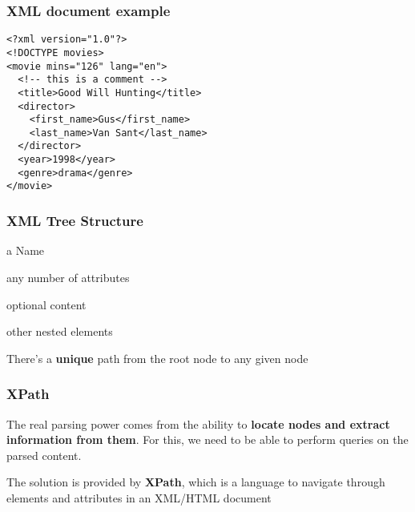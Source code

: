 \documentclass[12pt]{beamer}\usepackage[]{graphicx}\usepackage[]{color}
\begin{document}

\begin{frame}[fragile]
\frametitle{XML document example}

\begin{verbatim}
<?xml version="1.0"?>
<!DOCTYPE movies>
<movie mins="126" lang="en">
  <!-- this is a comment -->
  <title>Good Will Hunting</title>
  <director>
    <first_name>Gus</first_name>
    <last_name>Van Sant</last_name>
  </director>
  <year>1998</year>
  <genre>drama</genre>
</movie>
\end{verbatim}
\eb

\end{frame}


\begin{frame}
\frametitle{XML Tree Structure}

\bi
 \item a Name
 \item any number of attributes
 \item optional content
 \item other nested elements
\ei
\eb

There's a \textbf{unique} path from the root node to any given node 
\eb

\end{frame}


\begin{frame}
\begin{center}
\Huge{}
\end{center}
\end{frame}


\begin{frame}[fragile]
\frametitle{XPath}

The real parsing power comes from the ability to \textbf{locate nodes and extract information from them}. For this, we need to be able to perform queries on the parsed content.
\eb

The solution is provided by \textbf{XPath}, which is a language to navigate through elements and attributes in an XML/HTML document
\eb

\end{frame}
\end{document}
